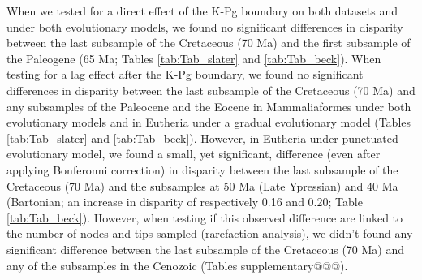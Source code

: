\documentclass[12pt,letterpaper]{article}
\begin{document}
When we tested for a direct effect of the K-Pg boundary on both datasets and under both evolutionary models, we found no significant differences in disparity between the last subsample of the Cretaceous (70 Ma) and the first subsample of the Paleogene (65 Ma; Tables \ref{tab:Tab_slater} and \ref{tab:Tab_beck}).
When testing for a lag effect after the K-Pg boundary, we found no significant differences in disparity between the last subsample of the Cretaceous (70 Ma) and any subsamples of the Paleocene and the Eocene in Mammaliaformes under both evolutionary models and in Eutheria under a gradual evolutionary model (Tables \ref{tab:Tab_slater} and \ref{tab:Tab_beck}).
However, in Eutheria under punctuated evolutionary model, we found a small, yet significant, difference (even after applying Bonferonni correction) in disparity between the last subsample of the Cretaceous (70 Ma) and the subsamples at 50 Ma (Late Ypressian) and 40 Ma (Bartonian; an increase in disparity of respectively 0.16 and 0.20; Table \ref{tab:Tab_beck}).
However, when testing if this observed difference are linked to the number of nodes and tips sampled (rarefaction analysis), we didn't found any significant difference between the last subsample of the Cretaceous (70 Ma) and any of the subsamples in the Cenozoic (Tables supplementary@@@).
\end{document}
